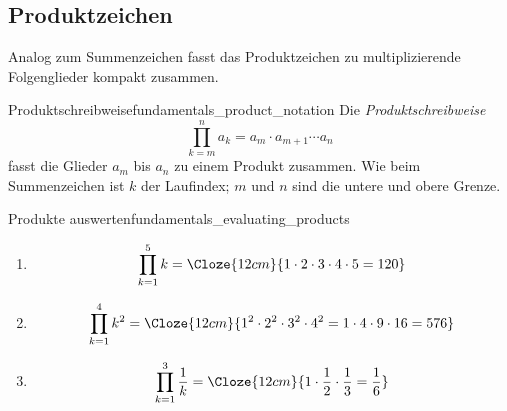 \subsection{Produktzeichen}
\label{subsec:fundamentals_product_notation}

Analog zum Summenzeichen fasst das Produktzeichen zu multiplizierende
Folgenglieder kompakt zusammen.

\begin{DefinitionBox}{Produktschreibweise}{fundamentals_product_notation}
  Die \emph{Produktschreibweise} 
  \[
    \prod_{k=m}^{n}a_k
      =a_m\cdot a_{m+1}\cdots a_n
  \]
  fasst die Glieder $a_m$ bis $a_n$ zu einem Produkt zusammen. Wie beim
  Summenzeichen ist $k$ der Laufindex; $m$ und $n$ sind die untere und obere
  Grenze.
\end{DefinitionBox}

\begin{ExampleBox}{Produkte auswerten}{fundamentals_evaluating_products}
  \begin{enumerate}[label=(\alph*),leftmargin=2em,itemsep=0.8em]
    \item\leavevmode
      \[
        \prod_{k=1}^{5}k
          =\Cloze{12cm}{1\cdot2\cdot3\cdot4\cdot5=120}
      \]
    \item\leavevmode
      \[
        \prod_{k=1}^{4}k^2
          =\Cloze{12cm}{1^2\cdot2^2\cdot3^2\cdot4^2
            =1\cdot4\cdot9\cdot16=576}
      \]
    \item\leavevmode
      \[
        \prod_{k=1}^{3}\frac1k
          =\Cloze{12cm}{1\cdot\frac12\cdot\frac13=\frac16}
      \]
  \end{enumerate}
\end{ExampleBox}
